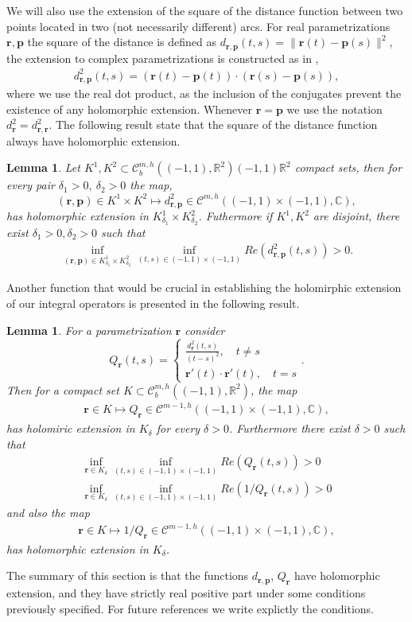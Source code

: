 \documentclass{article}
\newtheorem{lemma}[theorem]{Lemma}
\newcommand{\IC}{{\mathbb C}}
\newcommand{\IR}{{\mathbb R}}
\newcommand{\bp}{{\bm p}}
\newcommand{\cmspaceh}[4]{\mathcal{C}^{#1,#2} \left( #3, #4 \right)}
\newcommand{\rgeoh}[2]{\mathcal{C}_b^{#1,#2}\left( (-1,1), \IR^2 \right)}
\newcommand{\br}{\bm{r}}
\newcommand{\iinterv}{(-1,1)\times(-1,1)}
\begin{document}
We will also use the extension of the square of the distance function between two points located in two (not necessarily different) arcs. For real  parametrizations $\br,\bp$ the square of the distance is defined as $d_{\br,\bp}(t,s) = \| \br(t)-\bp(s)\|^2$, the extension to complex parametrizations is constructed as in \cite{Henriquez2021}, 
\begin{align*}
d^2_{\br,\bp}(t,s) = {(\br(t)-\bp(t))\cdot(\br(s)-\bp(s))},
\end{align*}
where we use the real dot product, as the inclusion of the conjugates prevent the existence of any holomorphic extension. Whenever $\br = \bp$ we use the notation $d^2_{\br} = d^2_{\br,\br}$. The following result state that the square of the distance function always have holomorphic extension.  
\begin{lemma} 
\label{lemma:squaredistance}
Let $K^1,K^2 \subset \rgeoh{m}{h}{(-1,1)}{\IR^2}$ compact sets, then for every pair $\delta_1>0, \ \delta_2 > 0$ the map, $$(\br,\bp) \in K^1 \times K^2 \mapsto d_{\br,\bp}^2 \in \cmspaceh{m}{h}{\iinterv}{\IC},$$has holomorphic extension in $K^1_{\delta_1} \times K^2_{\delta_2}$. Futhermore if $K^1,K^2$ are disjoint, there exist $\delta_1>0,\delta_2>0$ such that 
\begin{align*}
\inf_{(\br,\bp) \in K^1_{\delta_1}  \times K^2_{\delta_2}} 
\inf_{(t,s)\in \iinterv}
Re(d_{\br,\bp}^2(t,s))>0.
\end{align*}
\end{lemma}
Another function that would be crucial in establishing the holomirphic extension of our integral operators is presented in the following result.
\begin{lemma}
\label{lemma:Qfun}
For a parametrization $\br$ consider
$$
Q_{\br}(t,s) = \begin{cases}
\frac{d^2_{\br}(t,s)}{(t-s)^2}, \quad t\neq s \\
\br '(t) \cdot \br '(t), \quad t =s 
\end{cases}.
$$
Then for a compact set $K \subset \rgeoh{m}{h}$, the map  
\begin{align*}
\br \in K \mapsto Q_{\br} \in \cmspaceh{m-1}{h}{(-1,1)\times(-1,1)}{\IC},
\end{align*}
has holomiric extension in $K_\delta$ for every $\delta>0$. Furthermore there exist $\delta >0$ such that 
\begin{align*}
\inf_{\br \in K_\delta} \inf_{(t,s) \in (-1,1)\times (-1,1)} Re(Q_{\br}(t,s)) >0 \\
\inf_{\br \in K_\delta} \inf_{(t,s) \in (-1,1)\times (-1,1)} Re(1/Q_{\br}(t,s)) >0 
\end{align*}
and also the map 
\begin{align*}
\br \in K \mapsto 1/Q_{\br} \in \cmspaceh{m-1}{h}{(-1,1)\times(-1,1)}{\IC}, 
\end{align*} 
has holomorphic extension in $K_\delta$.
\end{lemma} 
The summary of this section is that the functions $d_{\br,\bp}$, $Q_{\br}$ have holomorphic extension, and they have strictly real positive part under some conditions previously specified. For future references we write explictly the conditions.
\end{document}
